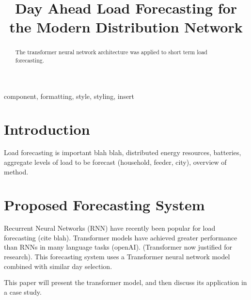 \documentclass[conference]{IEEEtran}
\begin{document}
\title{Day Ahead Load Forecasting for the Modern Distribution Network}

\author{
\and
{}
\and
{}
}

\maketitle

\begin{abstract}
The transformer neural network architecture was applied to short term load forecasting.
\end{abstract}

\begin{IEEEkeywords}
component, formatting, style, styling, insert
\end{IEEEkeywords}

\section{Introduction}
Load forecasting is important blah blah, distributed energy resources, batteries, aggregate levels of load to be forecast (household, feeder, city), overview of method.
\cite{Vaswani2017} %

\section{Proposed Forecasting System}
Recurrent Neural Networks (RNN) have recently been popular for load forecasting (cite blah).
Transformer models have achieved greater performance than RNNs in many language tasks (openAI).
(Transformer now justified for research).
This forecasting system uses a Transformer neural network model combined with similar day selection.
\par
This paper will present the transformer model, and then discuss its application in a case study.
\end{document}
